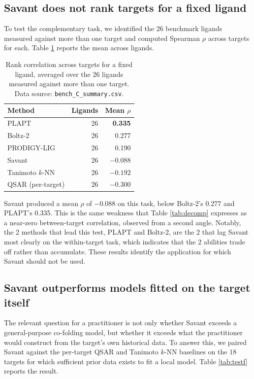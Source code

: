 \documentclass[11pt]{article}
\begin{document}
\subsection{Savant does not rank targets for a fixed ligand}
\label{sec:cross-target}

To test the complementary task, we identified the 26 benchmark ligands measured
against more than one target and computed Spearman $\rho$ across targets for
each. Table \ref{tab:testc} reports the mean across ligands.

\begin{table}[H]
\centering
\caption{Rank correlation across targets for a fixed ligand, averaged over the
26 ligands measured against more than one target. Data source:
\texttt{bench\_C\_summary.csv}.}
\label{tab:testc}
\begin{tabular}{lrr}
\toprule
Method & Ligands & Mean $\rho$ \\
\midrule
PLAPT             & 26 & \textbf{0.335} \\
Boltz-2           & 26 & 0.277 \\
PRODIGY-LIG       & 26 & 0.190 \\
Savant            & 26 & $-0.088$ \\
Tanimoto $k$-NN   & 26 & $-0.192$ \\
QSAR (per-target) & 26 & $-0.300$ \\
\bottomrule
\end{tabular}
\end{table}

Savant produced a mean $\rho$ of $-0.088$ on this task, below Boltz-2's 0.277
and PLAPT's 0.335. This is the same weakness that Table \ref{tab:decomp}
expresses as a near-zero between-target correlation, observed from a second
angle. Notably, the 2 methods that lead this test, PLAPT and Boltz-2, are the
2 that lag Savant most clearly on the within-target task, which indicates that
the 2 abilities trade off rather than accumulate. These results identify the
application for which Savant should not be used.

\subsection{Savant outperforms models fitted on the target itself}
\label{sec:testf}

The relevant question for a practitioner is not only whether Savant exceeds a
general-purpose co-folding model, but whether it exceeds what the practitioner
would construct from the target's own historical data. To answer this, we
paired Savant against the per-target QSAR and Tanimoto $k$-NN baselines on the
18 targets for which sufficient prior data exists to fit a local model. Table
\ref{tab:testf} reports the result.
\end{document}
